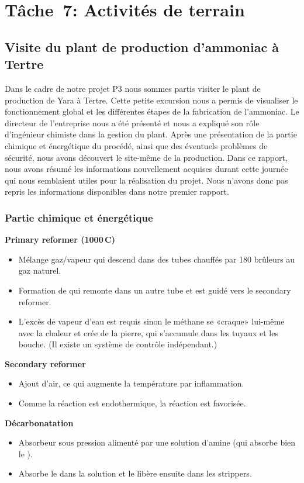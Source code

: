 \chapter{Tâche~7: Activités de terrain}
\section{Visite du plant de production d'ammoniac à Tertre}
Dans le cadre de notre projet P3 nous sommes partis visiter le plant de production de Yara à Tertre. Cette petite excursion nous a permis de visualiser le fonctionnement global et les différentes étapes de la fabrication de l'ammoniac. Le directeur de l'entreprise nous a été présenté et nous a expliqué son rôle d'ingénieur chimiste dans la gestion du plant. Après une présentation de la partie chimique et énergétique du procédé, ainsi que des éventuels problèmes de sécurité, nous avons découvert le site-même de la production. Dans ce rapport, nous avons résumé les informations nouvellement acquises durant cette journée qui nous semblaient utiles pour la réalisation du projet. Nous n'avons donc pas repris les informations disponibles dans notre premier rapport.
\subsection{Partie chimique et énergétique}
\textbf{Primary reformer (1000\,\degree C)}
\begin{itemize}
\item Mélange gaz/vapeur qui descend dans des tubes chauffés par 180 brûleurs au gaz naturel.
\item Formation de  qui remonte dans un autre tube et est guidé vers le secondary reformer.
\item L'excès de vapeur d'eau est requis sinon le méthane se «craque» lui-même avec la chaleur et crée de la pierre, qui s'accumule dans les tuyaux et les bouche. (Il existe un système de contrôle indépendant.)
\end{itemize}

\textbf{Secondary reformer }
\begin{itemize}
\item Ajout d'air, ce qui augmente la température par inflammation.
\item Comme la réaction est endothermique, la réaction est favorisée.
\end{itemize}

\textbf{Décarbonatation}
\begin{itemize}
\item Absorbeur sous pression alimenté par une solution d'amine (qui absorbe bien le ).
\item Absorbe le  dans la solution et le libère ensuite dans les strippers.
\end{itemize}

